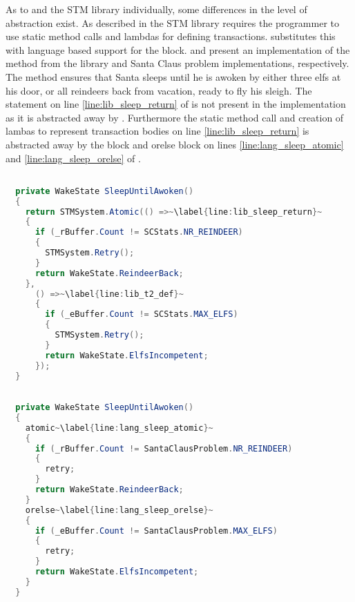 As to \stmname and the \ac{STM} library individually, some differences in the level of abstraction exist. As described in  the \ac{STM} library requires the programmer to use static method calls and lambdas for defining transactions. \stmname substitutes this with language based support for the  block.  and  present an implementation of the  method from the library and \stmname Santa Claus problem implementations, respectively. The method ensures that Santa sleeps until he is awoken by either three elfs at his door, or all reindeers back from vacation, ready to fly his sleigh. The  statement on line \ref{line:lib_sleep_return} of  is not present in the \stmname implementation as it is abstracted away by \stmname. Furthermore the static method call and creation of lambas to represent transaction bodies on line \ref{line:lib_sleep_return} is abstracted away by the  block and orelse block on lines \ref{line:lang_sleep_atomic} and \ref{line:lang_sleep_orelse} of .

\begin{lstlisting}[float,label=lst:lib_SleepUntilAwoken,
  caption={\bscode{SleepUntilAwoken} Method - \ac{STM} Library},
  language=Java,  
  showspaces=false,
  showtabs=false,
  breaklines=true,
  showstringspaces=false,
  breakatwhitespace=true,
  escapechar=~,
  commentstyle=\color{greencomments},
  keywordstyle=\color{bluekeywords},
  stringstyle=\color{redstrings},
  morekeywords={atomic, retry, orelse, var, get, set, ref, out}]  % Start your code-block

  private WakeState SleepUntilAwoken()
  {
    return STMSystem.Atomic(() =>~\label{line:lib_sleep_return}~
    {
      if (_rBuffer.Count != SCStats.NR_REINDEER)
      {
        STMSystem.Retry();
      }
      return WakeState.ReindeerBack;
    },
      () =>~\label{line:lib_t2_def}~
      {
        if (_eBuffer.Count != SCStats.MAX_ELFS)
        {
          STMSystem.Retry();
        }
        return WakeState.ElfsIncompetent;
      });
  }
\end{lstlisting}

\begin{lstlisting}[float,label=lst:lang_SleepUntilAwoken,
  caption={\bscode{SleepUntilAwoken} Method - \ac{STM} Language},
  language=Java,  
  showspaces=false,
  showtabs=false,
  breaklines=true,
  showstringspaces=false,
  breakatwhitespace=true,
  escapechar=~,
  commentstyle=\color{greencomments},
  keywordstyle=\color{bluekeywords},
  stringstyle=\color{redstrings},
  morekeywords={atomic, retry, orelse, var, get, set, ref, out}]  % Start your code-block

  private WakeState SleepUntilAwoken()
  {
    atomic~\label{line:lang_sleep_atomic}~
    {
      if (_rBuffer.Count != SantaClausProblem.NR_REINDEER)
      {
        retry;
      }
      return WakeState.ReindeerBack;
    }
    orelse~\label{line:lang_sleep_orelse}~
    {
      if (_eBuffer.Count != SantaClausProblem.MAX_ELFS)
      {
        retry;
      }
      return WakeState.ElfsIncompetent;
    }
  }
\end{lstlisting}

